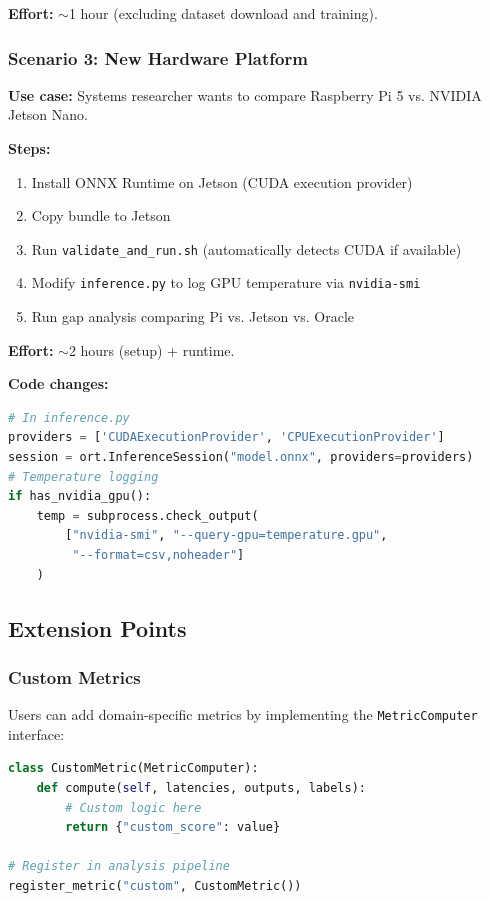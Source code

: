 \documentclass[review]{elsarticle}
\begin{document}
\textbf{Effort:} $\sim$1 hour (excluding dataset download and training).

\subsubsection{Scenario 3: New Hardware Platform}

\textbf{Use case:} Systems researcher wants to compare Raspberry Pi 5 vs. NVIDIA Jetson Nano.

\textbf{Steps:}

\begin{enumerate}
\item Install ONNX Runtime on Jetson (CUDA execution provider)
\item Copy bundle to Jetson
\item Run \texttt{validate\_and\_run.sh} (automatically detects CUDA if available)
\item Modify \texttt{inference.py} to log GPU temperature via \texttt{nvidia-smi}
\item Run gap analysis comparing Pi vs. Jetson vs. Oracle
\end{enumerate}

\textbf{Effort:} $\sim$2 hours (setup) + runtime.

\textbf{Code changes:}

\begin{lstlisting}[language=Python]
# In inference.py
providers = ['CUDAExecutionProvider', 'CPUExecutionProvider']
session = ort.InferenceSession("model.onnx", providers=providers)
# Temperature logging
if has_nvidia_gpu():
    temp = subprocess.check_output(
        ["nvidia-smi", "--query-gpu=temperature.gpu", 
         "--format=csv,noheader"]
    )
\end{lstlisting}

\subsection{Extension Points}

\subsubsection{Custom Metrics}

Users can add domain-specific metrics by implementing the \texttt{MetricComputer} interface:

\begin{lstlisting}[language=Python]
class CustomMetric(MetricComputer):
    def compute(self, latencies, outputs, labels):
        # Custom logic here
        return {"custom_score": value}

# Register in analysis pipeline
register_metric("custom", CustomMetric())
\end{lstlisting}
\end{document}
